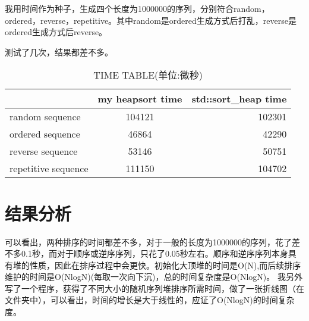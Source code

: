 \documentclass[UTF8]{ctexart}
\begin{document}
	\hspace{0em}我用时间作为种子，生成四个长度为1000000的序列，分别符合random，ordered，reverse，repetitive。其中random是ordered生成方式后打乱，reverse是ordered生成方式后reverse。
	
	\hspace{0em}测试了几次，结果都差不多。
	
	\begin{table}[h!]
		\begin{center}
			\caption{TIME TABLE(单位:微秒)}
			\begin{tabular}{|l|c|r|} 
				\textbf{} & \textbf{my heapsort time} & \textbf{std::sort\_heap time}\\
				\hline
				random sequence& 104121 & 102301\\
				ordered sequence& 46864 & 42290\\
				reverse sequence& 53146 & 50751\\
				repetitive sequence& 111150 & 104702\\
			\end{tabular}
		\end{center}
	\end{table}
	\section{结果分析}
	\hspace{0em}可以看出，两种排序的时间都差不多，对于一般的长度为1000000的序列，花了差不多0.1秒，而对于顺序或逆序序列，只花了0.05秒左右。顺序和逆序序列本身具有堆的性质，因此在排序过程中会更快。初始化大顶堆的时间是O(N),而后续排序维护的时间是O(NlogN)(每取一次向下沉)，总的时间复杂度是O(NlogN)。
	\hspace{0em}我另外写了一个程序，获得了不同大小的随机序列堆排序所需时间，做了一张折线图（在文件夹中），可以看出，时间的增长是大于线性的，应证了O(NlogN)的时间复杂度。
	
	

	
	
\end{document}
